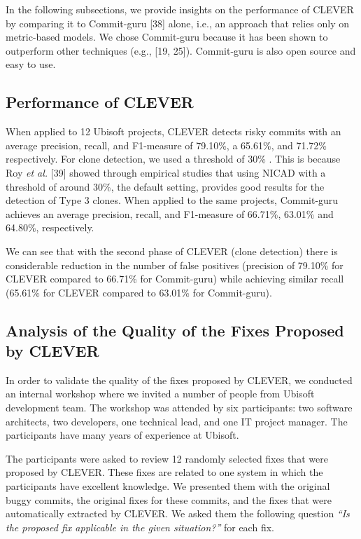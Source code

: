 \documentclass[sigconf]{acmart}
\begin{document}
In the following subsections, we provide insights on the performance of
CLEVER by comparing it to Commit-guru [38] alone, i.e., an approach
that relies only on metric-based models. We chose Commit-guru because it
has been shown to outperform other techniques (e.g., [19, 25]).
Commit-guru is also open source and easy to use.

\subsection{Performance of CLEVER}\label{performance-of-clever}

When applied to 12 Ubisoft projects, CLEVER detects risky commits with
an average precision, recall, and F1-measure of 79.10\%, a 65.61\%, and
71.72\% respectively. For clone detection, we used a threshold of 30\% .
This is because Roy \emph{et al.} [39] showed through empirical
studies that using NICAD with a threshold of around 30\%, the default
setting, provides good results for the detection of Type 3 clones. When
applied to the same projects, Commit-guru achieves an average precision,
recall, and F1-measure of 66.71\%, 63.01\% and 64.80\%, respectively.

We can see that with the second phase of CLEVER (clone detection) there
is considerable reduction in the number of false positives (precision of
79.10\% for CLEVER compared to 66.71\% for Commit-guru) while achieving
similar recall (65.61\% for CLEVER compared to 63.01\% for Commit-guru).



\subsection{Analysis of the Quality of the Fixes Proposed by
CLEVER}\label{analysis-of-the-quality-of-the-fixes-proposed-by-clever}

In order to validate the quality of the fixes proposed by CLEVER, we
conducted an internal workshop where we invited a number of people from
Ubisoft development team. The workshop was attended by six participants:
two software architects, two developers, one technical lead, and one IT
project manager. The participants have many years of experience at
Ubisoft.

The participants were asked to review 12 randomly selected fixes that
were proposed by CLEVER. These fixes are related to one system in which
the participants have excellent knowledge. We presented them with the
original buggy commits, the original fixes for these commits, and the
fixes that were automatically extracted by CLEVER. We asked them the
following question \emph{``Is the proposed fix applicable in the given
situation?''} for each fix.
\end{document}
